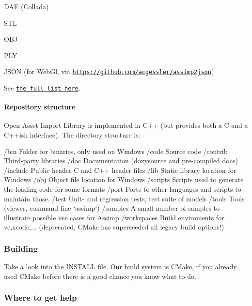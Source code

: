 \begin{DoxyItemize}
\item D\+A\+E (Collada)
\item S\+T\+L
\item O\+B\+J
\item P\+L\+Y
\item J\+S\+O\+N (for Web\+Gl, via \href{https://github.com/acgessler/assimp2json}{\tt https\+://github.\+com/acgessler/assimp2json})
\end{DoxyItemize}

See \href{http://assimp.sourceforge.net/main_features_formats.html}{\tt the full list here}.

\paragraph*{Repository structure}

Open Asset Import Library is implemented in C++ (but provides both a C and a C++ish interface). The directory structure is\+: \begin{DoxyVerb}/bin        Folder for binaries, only used on Windows
/code       Source code
/contrib    Third-party libraries
/doc        Documentation (doxysource and pre-compiled docs)
/include    Public header C and C++ header files
/lib        Static library location for Windows
/obj        Object file location for Windows
/scripts    Scripts used to generate the loading code for some formats
/port       Ports to other languages and scripts to maintain those.
/test       Unit- and regression tests, test suite of models
/tools      Tools (viewer, command line `assimp`)
/samples    A small number of samples to illustrate possible 
                    use cases for Assimp
/workspaces Build enviroments for vc,xcode,... (deprecated,
        CMake has superseeded all legacy build options!)
\end{DoxyVerb}


\subsubsection*{Building}

Take a look into the {\ttfamily I\+N\+S\+T\+A\+L\+L} file. Our build system is C\+Make, if you already used C\+Make before there is a good chance you know what to do.

\subsubsection*{Where to get help}

